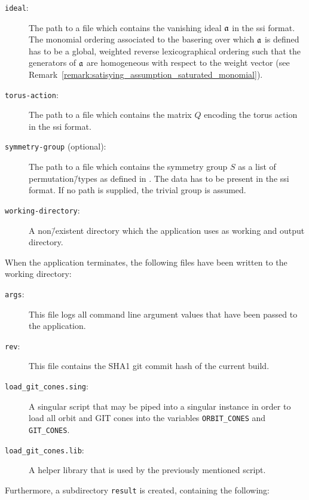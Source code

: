 \begin{description}
	\item[\texttt{ideal}:] The path to a file which contains the vanishing ideal $\mathfrak{a}$ in the \ac{ssi} format. The monomial ordering associated to the basering over which $\mathfrak{a}$ is defined has to be a global, weighted reverse lexicographical ordering such that the generators of $\mathfrak{a}$ are homogeneous with respect to the weight vector (see Remark~\ref{remark:satisying_assumption_saturated_monomial}).
	\item[\texttt{torus-action}:] The path to a file which contains the matrix $Q$ encoding the torus action in the \ac{ssi} format.
	\item[\texttt{symmetry-group} (optional):] The path to a file which contains the symmetry group $S$ as a list of permutation\=/types as defined in \gitfanlib{}. The data has to be present in the \ac{ssi} format. If no path is supplied, the trivial group is assumed.
	\item[\texttt{working-directory}:] A non\=/existent directory which the application uses as working and output directory.
\end{description}

When the application terminates, the following files have been written to the working directory:

\begin{description}
	\item[\texttt{args}:] This file logs all command line argument values that have been passed to the application.
	\item[\texttt{rev}:] This file contains the SHA1 git commit hash of the current build.
	\item[\texttt{load\_git\_cones.sing}:] A singular script that may be piped into a singular instance in order to load all orbit and GIT cones into the variables \texttt{ORBIT\_CONES} and \texttt{GIT\_CONES}.
	\item[\texttt{load\_git\_cones.lib}:] A helper library that is used by the previously mentioned script.
\end{description}

Furthermore, a subdirectory \texttt{result} is created, containing the following:

